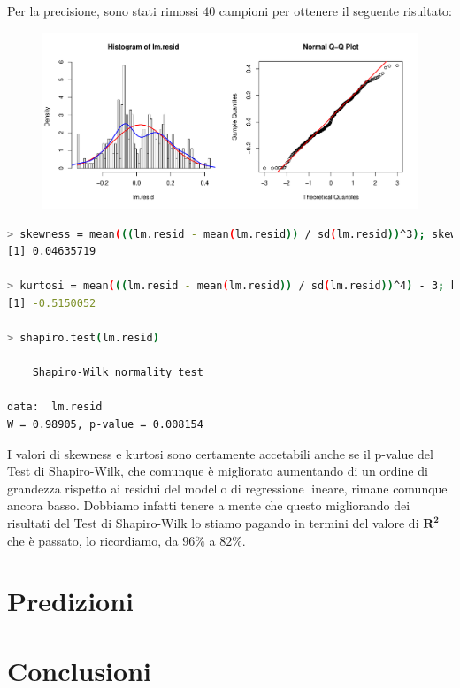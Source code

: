 \documentclass[11pt,a4paper]{article}
\begin{document}
\vspace{-2cm}\noindent
Per la precisione, sono stati rimossi $40$ campioni per ottenere il seguente
risultato:
\begin{figure}[H]
	\begin{center}
		\hspace*{-1.5cm}
		\includegraphics[scale=0.7]{imgs/residuals_2_exp.pdf}
	\end{center}
\end{figure}
\vspace{-1.1cm}
\begin{lstlisting}[language=bash,basicstyle=\tiny,tabsize=2,frame = single]
> skewness = mean(((lm.resid - mean(lm.resid)) / sd(lm.resid))^3); skewness
[1] 0.04635719

> kurtosi = mean(((lm.resid - mean(lm.resid)) / sd(lm.resid))^4) - 3; kurtosi
[1] -0.5150052

> shapiro.test(lm.resid)

	Shapiro-Wilk normality test

data:  lm.resid
W = 0.98905, p-value = 0.008154
\end{lstlisting}
I valori di skewness e kurtosi sono certamente accetabili anche se il p-value
del Test di Shapiro-Wilk, che comunque \`e migliorato aumentando di un ordine di
grandezza rispetto ai residui del modello di regressione lineare, rimane
comunque ancora basso. Dobbiamo infatti tenere a mente che questo migliorando
dei risultati del Test di Shapiro-Wilk lo stiamo pagando in termini del valore
di $\boldsymbol{R^2}$ che \`e passato, lo ricordiamo, da $96\%$ a $82\%$.
\section{Predizioni}

\section{Conclusioni}
\end{document}
